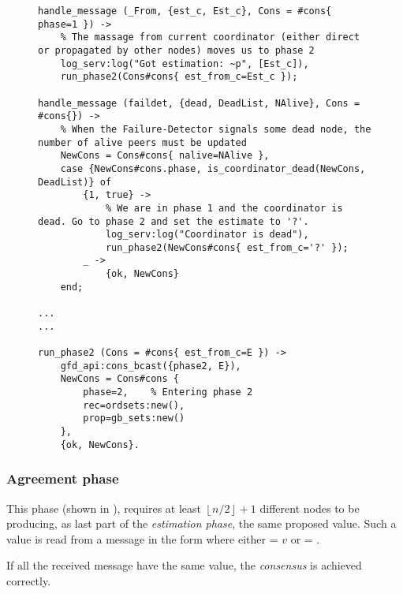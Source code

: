 \begin{figure}[hbt]
\begin{lstlisting}[caption={Estimation phase},
                   label={code:ConsEstimation}]
handle_message (_From, {est_c, Est_c}, Cons = #cons{ phase=1 }) ->
    % The massage from current coordinator (either direct or propagated by other nodes) moves us to phase 2
    log_serv:log("Got estimation: ~p", [Est_c]),
    run_phase2(Cons#cons{ est_from_c=Est_c });

handle_message (faildet, {dead, DeadList, NAlive}, Cons = #cons{}) ->
    % When the Failure-Detector signals some dead node, the number of alive peers must be updated
    NewCons = Cons#cons{ nalive=NAlive },
    case {NewCons#cons.phase, is_coordinator_dead(NewCons, DeadList)} of
        {1, true} ->
            % We are in phase 1 and the coordinator is dead. Go to phase 2 and set the estimate to '?'.
            log_serv:log("Coordinator is dead"),
            run_phase2(NewCons#cons{ est_from_c='?' });
        _ ->
            {ok, NewCons}
    end;

...
...

run_phase2 (Cons = #cons{ est_from_c=E }) ->
    gfd_api:cons_bcast({phase2, E}),
    NewCons = Cons#cons {
        phase=2,    % Entering phase 2
        rec=ordsets:new(),
        prop=gb_sets:new()
    },
    {ok, NewCons}.
\end{lstlisting}
\end{figure}

\subsubsection{Agreement phase} \label{subsub:ConsAgreement}

This phase (shown in ), requires at least
$\left\lfloor n/2 \right\rfloor + 1$ different nodes to be producing, as
last part of the \emph{estimation phase}, the same proposed value. Such a
value is read from a message in the form  where
either  = $v$ or  = .

If all the received message have the same value, the \emph{consensus} is
achieved correctly.


